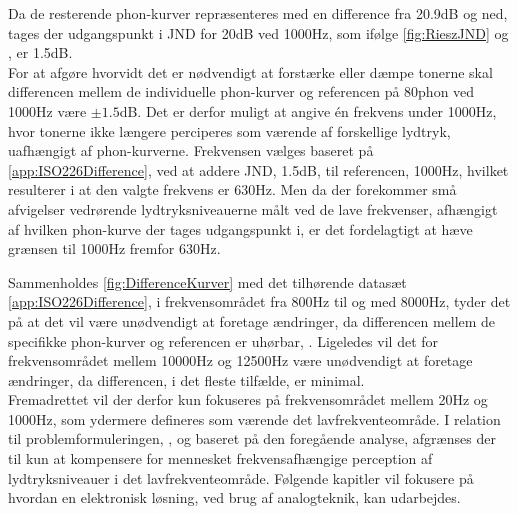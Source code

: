 Da de resterende phon-kurver repræsenteres med en difference fra 20.9dB og ned, tages der udgangspunkt i JND for 20dB ved 1000Hz, som ifølge \autoref{fig:RieszJND} og \textcite[s. 61]{BOOK:AnIntroductionToThePsycologyOfHearing}, er 1.5dB.\\[5mm]
%
For at afgøre hvorvidt det er nødvendigt at forstærke eller dæmpe tonerne skal differencen mellem de individuelle phon-kurver og referencen på 80phon ved 1000Hz være $\pm 1.5$dB. Det er derfor muligt at angive én frekvens under 1000Hz, hvor tonerne ikke længere perciperes som værende af forskellige lydtryk, uafhængigt af phon-kurverne. Frekvensen vælges baseret på \autoref{app:ISO226Difference}, ved at addere JND, 1.5dB, til referencen, 1000Hz, hvilket resulterer i at den valgte frekvens er 630Hz. Men da der forekommer små afvigelser vedrørende lydtryksniveauerne målt ved de lave frekvenser, afhængigt af hvilken phon-kurve der tages udgangspunkt i, er det fordelagtigt at hæve grænsen til 1000Hz fremfor 630Hz.

Sammenholdes \autoref{fig:DifferenceKurver} med det tilhørende datasæt \autoref{app:ISO226Difference}, i frekvensområdet fra 800Hz til og med 8000Hz, tyder det på at det vil være unødvendigt at foretage ændringer, da differencen mellem de specifikke phon-kurver og referencen er uhørbar, \parencite[s. 60]{BOOK:AnIntroductionToThePsycologyOfHearing}. Ligeledes vil det for frekvensområdet mellem 10000Hz og 12500Hz være unødvendigt at foretage ændringer, da differencen, i det fleste tilfælde, er minimal.\\[5mm]
%
Fremadrettet vil der derfor kun fokuseres på frekvensområdet mellem 20Hz og 1000Hz, som ydermere defineres som værende det lavfrekventeområde. I relation til problemformuleringen, , og baseret på den foregående analyse, afgrænses der til kun at kompensere for mennesket frekvensafhængige perception af lydtryksniveauer i det lavfrekventeområde. Følgende kapitler vil fokusere på hvordan en elektronisk løsning, ved brug af analogteknik, kan udarbejdes.

